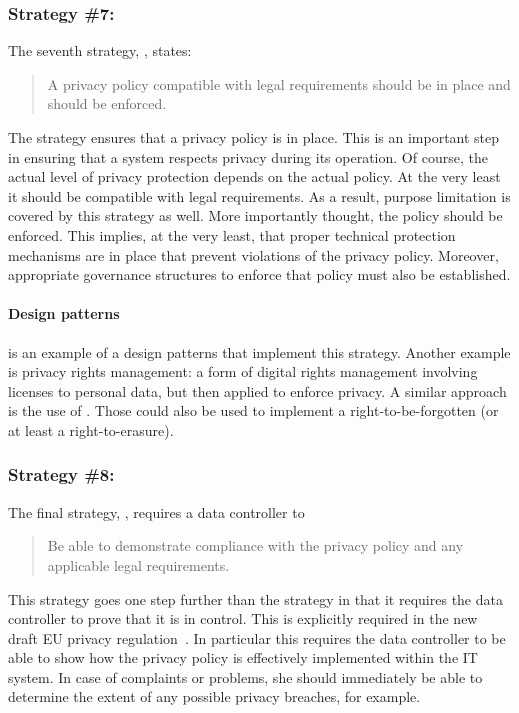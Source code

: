 \subsubsection{Strategy \#7: }

The seventh strategy, , states: 
\begin{quote}
A privacy policy compatible with legal requirements should be in place and should be enforced.
\end{quote}
The  strategy ensures that a privacy policy is in place. This is an important step in ensuring that a system respects privacy during its operation. Of course, the actual level of privacy protection depends on the actual policy. At the very least it should be compatible with legal requirements. As a result, purpose limitation is covered by this strategy as well.
More importantly thought, the policy should be enforced. This implies, at the very least, that proper technical protection mechanisms are in place that prevent violations of the privacy policy. Moreover, appropriate governance structures to enforce that policy must also be established.

\paragraph{Design patterns}

 is an example of a design patterns that implement this strategy. Another example is privacy rights management: a form of digital rights management involving licenses to personal data, but then applied to enforce privacy. A similar approach is the use of . Those could also be used to implement a right-to-be-forgotten (or at least a right-to-erasure).

\subsubsection{Strategy \#8: }

The final strategy, , requires a data controller to 
\begin{quote}
Be able to demonstrate compliance with the privacy policy and any applicable legal requirements.
\end{quote}
This strategy goes one step further than the  strategy in that it requires the data controller to prove that it is in control. This is explicitly required in the new draft EU privacy regulation~\cite{COM(2012)11}.
In particular this requires the data controller to be able to show how the privacy policy is effectively implemented within the IT system. In case of complaints or problems, she should immediately be able to determine the extent of any possible privacy breaches, for example.


